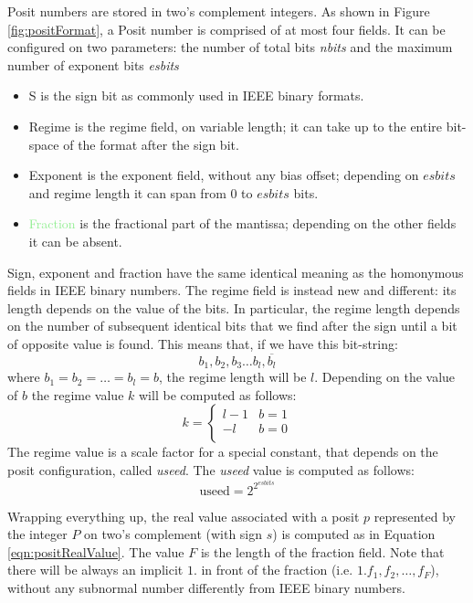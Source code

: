 Posit numbers are stored in two's complement integers. As shown in Figure \ref{fig:positFormat}, a Posit number is comprised of at most four fields. It can be configured on two parameters: the number of total bits \textit{nbits} and the maximum number of exponent bits \textit{esbits}
\begin{itemize}
    \item  \textcolor{asparago}{S} is the sign bit as commonly used in IEEE binary formats.
    \item \textcolor{amber}{Regime} is the regime field, on variable length; it can take up to the entire bit-space of the format after the sign bit.
    \item \textcolor{lightred}{Exponent} is the exponent field, without any bias offset; depending on $esbits$ and regime length it can span from $0$ to $esbits$ bits.
    \item \textcolor{lightgreen}{Fraction} is the fractional part of the mantissa; depending on the other fields it can be absent.
\end{itemize}
Sign, exponent and fraction have the same identical meaning as the homonymous fields in IEEE binary numbers. 
The regime field is instead new and different: its length depends on the value of the bits. In particular, the regime length depends on the number of subsequent identical bits that we find after the sign until a bit of opposite value is found. This means that, if we have this bit-string:
\begin{equation}
    b_1, b_2, b_3 \dots b_l, \overline{b_{l}}
\end{equation}
 where $b_1 = b_2 = \dots = b_l = b$, the regime length will be $l$. Depending on the value of $b$ the regime value $k$ will be computed as follows:
\begin{equation}\label{eqn:regimeValue}
k = \left\{\begin{matrix}
 l-1& b = 1  \\
 -l & b = 0  \\
\end{matrix}\right.
\end{equation}
The regime value is a scale factor for a special constant, that depends on the posit configuration, called \textit{useed}. The \textit{useed} value is computed as follows:
\begin{equation}\label{eqn:useed}
    \text{useed} = 2^{2^{esbits}}
\end{equation}

Wrapping everything up, the real value associated with a posit $p$ represented by the integer $P$ on two's complement (with sign $s$) is computed as in Equation \eqref{eqn:positRealValue}. The value $F$ is the length of the fraction field. Note that there will be always an implicit $1.$ in front of the fraction (i.e. $1.f_1,f_2, \dots, f_F$), without any subnormal number differently from IEEE binary numbers.

